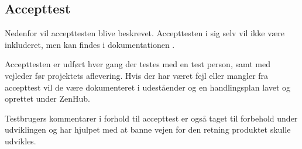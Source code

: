 \subsection{Accepttest}

Nedenfor vil accepttesten blive beskrevet. Accepttesten i sig selv vil ikke være inkluderet, men kan findes i dokumentationen . 

Accepttesten er udført hver gang der testes med en test person, samt med vejleder før projektets aflevering. Hvis der har været fejl eller mangler fra accepttest vil de være dokumenteret i udeståender og en handlingsplan lavet og oprettet under ZenHub. 

Testbrugers kommentarer i forhold til accepttest er også taget til forbehold under udviklingen og har hjulpet med at banne vejen for den retning produktet skulle udvikles.